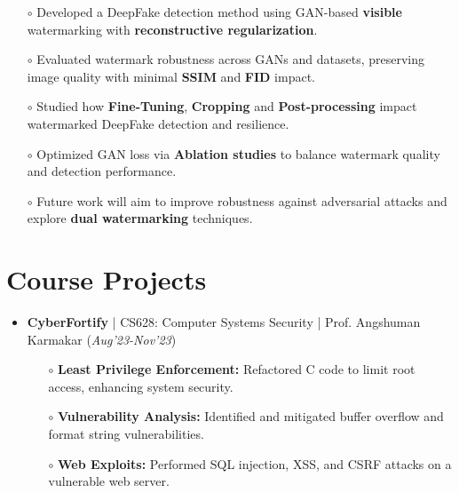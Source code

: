\documentclass[10.8pt, a4paper]{extarticle}
\newcommand{\shorterSection}[1]{\vspace{-10pt}\section{#1}}
\begin{document}
{\begin{itemize}
\begin{itemize}
          \item[$\circ$]  Developed a DeepFake detection method using GAN-based \textbf{visible} watermarking with \textbf{reconstructive regularization}.\\[-0.6cm]
          
          \item[$\circ$]  Evaluated watermark robustness across GANs and datasets, preserving image quality with minimal \textbf{SSIM} and \textbf{FID} impact.\\[-0.6cm]
          
          \item[$\circ$] Studied how \textbf{Fine-Tuning}, \textbf{Cropping} and \textbf{Post-processing} impact watermarked DeepFake detection and resilience.\\[-0.6cm]
          
          \item[$\circ$] Optimized GAN loss via \textbf{Ablation studies} to balance watermark quality and detection performance.\\[-0.6cm]

          \item[$\circ$]  Future work will aim to improve robustness against adversarial attacks and explore \textbf{dual watermarking} techniques.\\[-0.6cm]

          
    \end{itemize}
\end{itemize}

\vspace{1.2mm}

\shorterSection{Course Projects}
\vspace{-2pt}
\begin{itemize}

\item \textbf{CyberFortify} | CS628: Computer Systems Security | Prof. Angshuman Karmakar \href{https://github.com/vishalsavarna/CyberFortify-CS628}{\faGithub{}} \hfill(\textit{Aug'23-Nov'23})
	\\[-0.6cm]
	\begin{itemize}
	    \item[$\circ$] \textbf{Least Privilege Enforcement:} Refactored C code to limit root access, enhancing system security.\\[-0.6cm]
\item[$\circ$] \textbf{Vulnerability Analysis:} Identified and mitigated buffer overflow and format string vulnerabilities. \\[-0.6cm]
\item[$\circ$] \textbf{Web Exploits:} Performed SQL injection, XSS, and CSRF attacks on a vulnerable web server.\\[-0.6cm]


\end{itemize}
\end{itemize}}
\end{document}
